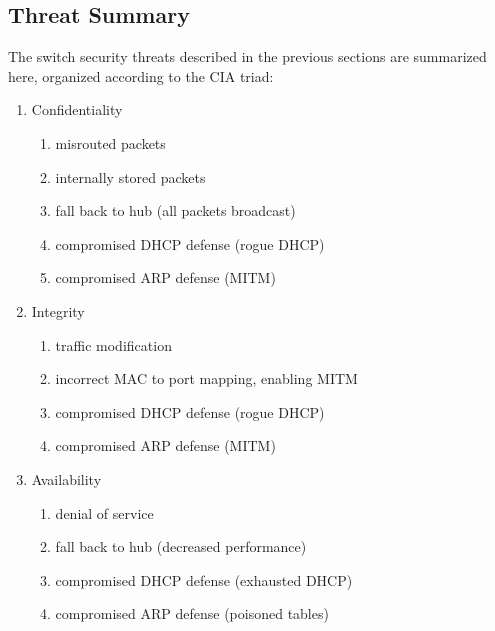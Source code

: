 \documentclass[journal]{IEEEtran}
\begin{document}
\subsection{Threat Summary}
The switch security threats described in the previous sections are summarized here, organized
according to the CIA triad:
\begin{enumerate}
  \item Confidentiality
  \begin{enumerate}
    \item misrouted packets
    \item internally stored packets
    \item fall back to hub (all packets broadcast)
    \item compromised DHCP defense (rogue DHCP)
    \item compromised ARP defense (MITM)
  \end{enumerate}
  \item Integrity
  \begin{enumerate}
    \item traffic modification
    \item incorrect MAC to port mapping, enabling MITM
    \item compromised DHCP defense (rogue DHCP)
    \item compromised ARP defense (MITM)
  \end{enumerate}
  \item Availability
  \begin{enumerate}
    \item denial of service
    \item fall back to hub (decreased performance)
    \item compromised DHCP defense (exhausted DHCP)
    \item compromised ARP defense (poisoned tables)
  \end{enumerate}
\end{enumerate}
\end{document}
